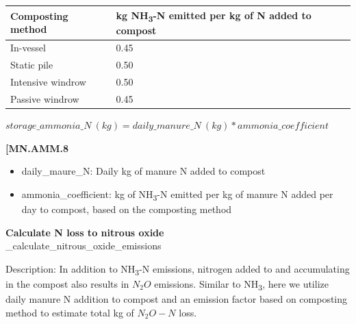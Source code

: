 \begin{refsection}
\begin{table}[h!]
    \begin{tabular}{@{} C{3cm} C{4cm}  @{}}
    \toprule
    \textbf{Composting method} & \textbf{kg NH\textsubscript{3}-N emitted per kg of N added to compost}   \\
    \midrule


In-vessel & 0.45 \\
Static pile & 0.50 \\
Intensive windrow & 0.50 \\
Passive windrow & 0.45 \\


    \bottomrule
    \end{tabular}
    \end{table} 
            \vspace{0.25cm}

        \begin{center}
            \(storage\_ammonia\_N\ (kg) = daily\_manure\_N\ (kg) * ammonia\_coefficient\)
        \end{center}
        \vspace{0.5cm} 
    
            {\raggedleft \textbf{[MN.AMM.8}\par}
            \vspace{0.5cm}
            
        \begin{itemize}
            \item daily\_maure\_N: Daily kg of manure N added to compost
            \item ammonia\_coefficient: kg of NH\textsubscript{3}-N emitted per kg of manure N added per day to compost, based on the composting method 

        \end{itemize}


\textbf{Calculate N loss to nitrous oxide}\\
\_calculate\_nitrous\_oxide\_emissions\\
\vspace{0.2cm}

Description: In addition to NH\textsubscript{3}-N emissions, nitrogen added to and accumulating in the compost also results in  \(N_2O\) emissions. Similar to NH\textsubscript{3}, here we utilize daily manure N addition to compost and an emission factor based on composting method \parencite{Hanson2024} to estimate total kg of  \(N_2O-N\) loss.
    \begin{table}[h!]
    \centering
    \renewcommand{\arraystretch}{1.3}


\end{table}
\end{refsection}
